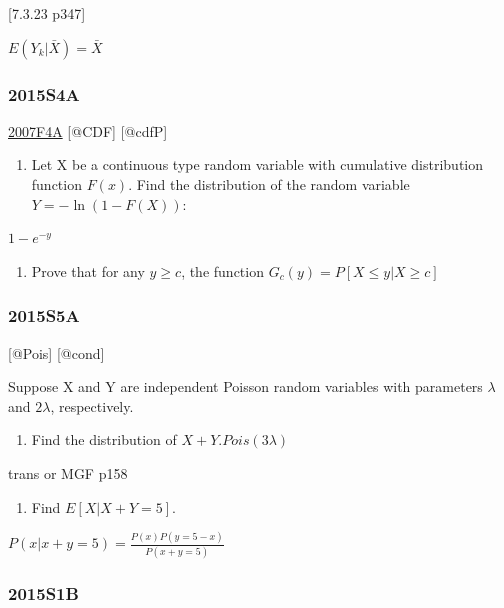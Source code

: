 \documentclass[6pt,twocolumn,Portrait]{article}
\providecommand{\tightlist}{%
  \setlength{\itemsep}{0pt}\setlength{\parskip}{0pt}}
\begin{document}
{[}7.3.23 p347{]}

\(E(Y_k|\bar X)=\bar X\)

\hypertarget{s4a-1}{%
\subsubsection{2015S4A}\label{s4a-1}}

\protect\hyperlink{f4a}{2007F4A} {[}@CDF{]} {[}@cdfP{]}

\begin{enumerate}
\def\labelenumi{(\alph{enumi})}
\tightlist
\item
  Let X be a continuous type random variable with cumulative
  distribution function \(F(x)\). Find the distribution of the random
  variable \(Y=-\ln(1-F(X))\):
\end{enumerate}

\(1-e^{-y}\)

\begin{enumerate}
\def\labelenumi{(\alph{enumi})}
\setcounter{enumi}{1}
\tightlist
\item
  Prove that for any \(y\ge c\), the function
  \(G_c(y)=P[X\le y|X\ge c]\)
\end{enumerate}

\hypertarget{s5a-1}{%
\subsubsection{2015S5A}\label{s5a-1}}

{[}@Pois{]} {[}@cond{]}

Suppose X and Y are independent Poisson random variables with parameters
\(\lambda\) and \(2\lambda\), respectively.

\begin{enumerate}
\def\labelenumi{(\alph{enumi})}
\tightlist
\item
  Find the distribution of \(X+Y\).\(Pois(3\lambda)\)
\end{enumerate}

trans or MGF p158

\begin{enumerate}
\def\labelenumi{(\alph{enumi})}
\setcounter{enumi}{1}
\tightlist
\item
  Find \(E[X|X+Y=5]\).
\end{enumerate}

\(P(x|x+y=5)=\frac{P(x)P(y=5-x)}{P(x+y=5)}\)

\hypertarget{s1b-1}{%
\subsubsection{2015S1B}\label{s1b-1}}
\end{document}
